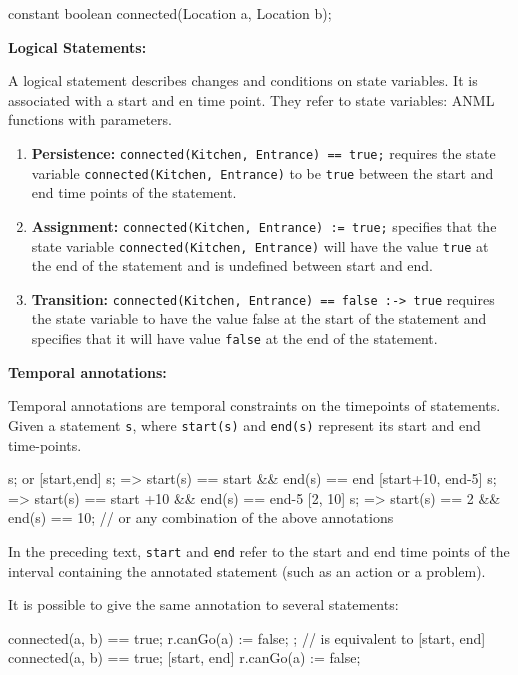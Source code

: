 \begin{anmlcode}
constant boolean connected(Location a, Location b);
\end{anmlcode}



{\bf Logical Statements:}

A logical statement describes changes and conditions on state variables. It is
associated with a start and en time point.
They refer to state variables: ANML functions with parameters.
\begin{enumerate}
  \item {\bf Persistence:} \lstinline!connected(Kitchen, Entrance) == true;! requires the state
  variable \lstinline!connected(Kitchen, Entrance)! to be \lstinline!true! between the start and
  end time points of the statement.
  \item {\bf Assignment:} \lstinline!connected(Kitchen, Entrance) := true;! specifies that the
  state variable \lstinline!connected(Kitchen, Entrance)! will have the value \lstinline!true! at
  the end of the statement and is undefined between start and end.
  \item {\bf Transition:} \lstinline!connected(Kitchen, Entrance) == false :-> true! requires the
  state variable to have the value false at the start of the statement and
  specifies that it will have value \lstinline!false! at the end of the statement.
\end{enumerate}

{\bf Temporal annotations:}

Temporal annotations are temporal constraints on the timepoints of
statements. Given a statement \lstinline!s!, where \lstinline!start(s)! and \lstinline!end(s)! represent its
start and end time-points.
\begin{anmlcode}
[all] s; or [start,end] s;
=> start(s) == start && end(s) == end
[start+10, end-5] s;
=> start(s) == start +10 && end(s) == end-5
[2, 10] s;
=> start(s) == 2 && end(s) == 10;
// or any combination of the above annotations
\end{anmlcode}
  
In the preceding text, \lstinline!start! and \lstinline!end! refer to the start and end time
points of the interval containing the annotated statement (such as an action
or a problem).

It is possible to give the same annotation to several statements:
\begin{anmlcode}
 {
  connected(a, b) == true;
  r.canGo(a) := false;
};
// is equivalent to
[start, end] connected(a, b) == true;
[start, end] r.canGo(a) := false;
\end{anmlcode}


